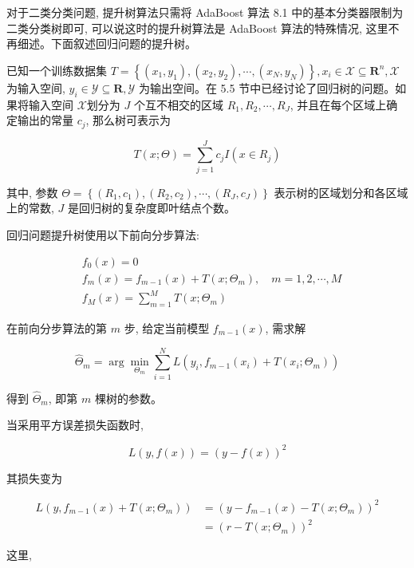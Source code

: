 \documentclass[10pt]{article}
\begin{document}
对于二类分类问题, 提升树算法只需将 AdaBoost 算法 8.1 中的基本分类器限制为二类分类树即可, 可以说这时的提升树算法是 AdaBoost 算法的特殊情况, 这里不再细述。下面叙述回归问题的提升树。

已知一个训练数据集 $T=\left\{\left(x_{1}, y_{1}\right),\left(x_{2}, y_{2}\right), \cdots,\left(x_{N}, y_{N}\right)\right\}, x_{i} \in \mathcal{X} \subseteq \boldsymbol{R}^{n}, \mathcal{X}$ 为输入空间, $y_{i} \in \mathcal{Y} \subseteq \boldsymbol{R}, \mathcal{Y}$ 为输出空间。在 5.5 节中已经讨论了回归树的问题。如果将输入空间 $\mathcal{X}$划分为 $J$ 个互不相交的区域 $R_{1}, R_{2}, \cdots, R_{J}$, 并且在每个区域上确定输出的常量 $c_{j}$, 那么树可表示为


\begin{equation*}
T(x ; \Theta)=\sum_{j=1}^{J} c_{j} I\left(x \in R_{j}\right) \tag{8.27}
\end{equation*}


其中, 参数 $\Theta=\left\{\left(R_{1}, c_{1}\right),\left(R_{2}, c_{2}\right), \cdots,\left(R_{J}, c_{J}\right)\right\}$ 表示树的区域划分和各区域上的常数, $J$ 是回归树的复杂度即叶结点个数。

回归问题提升树使用以下前向分步算法:

$$
\begin{aligned}
& f_{0}(x)=0 \\
& f_{m}(x)=f_{m-1}(x)+T\left(x ; \Theta_{m}\right), \quad m=1,2, \cdots, M \\
& f_{M}(x)=\sum_{m=1}^{M} T\left(x ; \Theta_{m}\right)
\end{aligned}
$$

在前向分步算法的第 $m$ 步, 给定当前模型 $f_{m-1}(x)$, 需求解

$$
\hat{\Theta}_{m}=\arg \min _{\Theta_{m}} \sum_{i=1}^{N} L\left(y_{i}, f_{m-1}\left(x_{i}\right)+T\left(x_{i} ; \Theta_{m}\right)\right)
$$

得到 $\hat{\Theta}_{m}$, 即第 $m$ 棵树的参数。

当采用平方误差损失函数时,

$$
L(y, f(x))=(y-f(x))^{2}
$$

其损失变为

$$
\begin{aligned}
L\left(y, f_{m-1}(x)+T\left(x ; \Theta_{m}\right)\right) & =\left(y-f_{m-1}(x)-T\left(x ; \Theta_{m}\right)\right)^{2} \\
& =\left(r-T\left(x ; \Theta_{m}\right)\right)^{2}
\end{aligned}
$$

这里,
\end{document}
